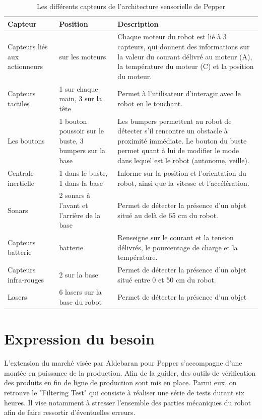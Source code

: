 \begin{table}[h]
	\begin{tabular}{ | p{3cm} | p{4cm} | p{7cm} | }
		\hline
		Capteur & Position & Description \\
		\hline
		Capteurs liés aux actionneurs & sur les moteurs & Chaque moteur du robot est lié à 3 capteurs, qui donnent des informations sur la valeur du courant délivré au moteur (A), la température du moteur (\degres C) et la position du moteur. \\
		\hline
		Capteurs tactiles & 1 sur chaque main, 3 sur la tête & Permet à l'utilisateur d'interagir avec le robot en le touchant.	\\	
		\hline 
		Les boutons & 1 bouton poussoir sur le buste, 3 bumpers sur la base & Les bumpers permettent au robot de détecter s'il rencontre un obstacle à proximité immédiate. Le bouton du buste permet quant à lui de modifier le mode dans lequel est le robot (autonome, veille). \\
		\hline 
		Centrale inertielle & 1 dans le buste, 1 dans la base & Informe sur la position et l'orientation du robot, ainsi que la vitesse et l'accélération. \\
		\hline
		Sonars & 2 sonars à l'avant et l'arrière de la base & Permet de détecter la présence d'un objet situé au delà de 65 cm du robot. \\
		\hline 
		Capteurs batterie & batterie & Renseigne sur le courant et la tension délivrés, le pourcentage de charge et la température. \\
		\hline
		Capteurs infra-rouges & 2 sur la base &  Permet de détecter la présence d'un objet situé entre 0 et 50 cm du robot. \\
		\hline
		Lasers & 6 lasers sur la base du robot & Permet de détecter la présence d'un objet \\
		\hline 
	\end{tabular}
	\caption[Les différents capteurs de Pepper]{Les différents capteurs de l'architecture sensorielle de Pepper}
	\label {tab: Les différents capteurs de Pepper}
\end{table}


\section{Expression du besoin}
\label{Introduction:Expression du besoin}
L'extension du marché visée par Aldebaran pour Pepper s'accompagne d'une montée en puissance de la production. Afin de la guider, des outils de vérification des produits en fin de ligne de production sont mis en place. Parmi eux, on retrouve le "Filtering Test" qui consiste à réaliser une série de tests durant six heures. Il vise notamment à stresser l'ensemble des parties mécaniques du robot afin de faire ressortir d'éventuelles erreurs.


